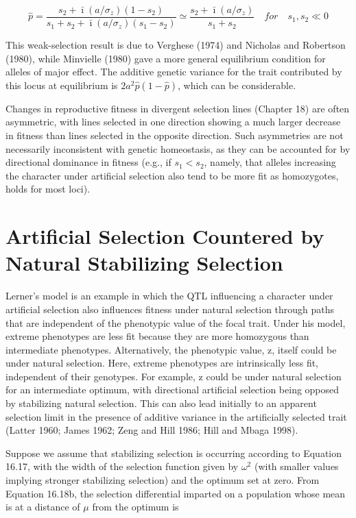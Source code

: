 \documentclass{article}
\begin{document}
\begin{equation}
\widehat{p}=\frac{s_{2}+\bar{\imath}\left(a/\sigma_{z}\right)\left(1-s_{2}\right)}{s_{1}+s_{2}+\bar{\imath}\left(a/\sigma_{z}\right)\left(s_{1}-s_{2}\right)}\simeq\frac{s_{2}+\bar{\imath}\left(a/\sigma_{z}\right)}{s_{1}+s_{2}}\quad for\quad s_{1},s_{2}\ll0
\tag{25.16}
\label{eq:25_16}
\end{equation}

This weak-selection result is due to Verghese (1974) and Nicholas and Robertson (1980), while Minvielle (1980) gave a more general equilibrium condition for alleles of major effect. The additive genetic variance for the trait contributed by this locus at equilibrium is  $ 2a^2 \widehat{p}(1 - \widehat{p}) $, which can be considerable.

Changes in reproductive fitness in divergent selection lines (Chapter 18) are often asymmetric, with lines selected in one direction showing a much larger decrease in fitness than lines selected in the opposite direction. Such asymmetries are not necessarily inconsistent with genetic homeostasis, as they can be accounted for by directional dominance in fitness (e.g., if  $ s_1 < s_2 $, namely, that alleles increasing the character under artificial selection also tend to be more fit as homozygotes, holds for most loci).

\section{Artificial Selection Countered by Natural Stabilizing Selection}
Lerner's model is an example in which the QTL influencing a character under artificial selection also influences fitness under natural selection through paths that are independent of the phenotypic value of the focal trait. Under his model, extreme phenotypes are less fit because they are more homozygous than intermediate phenotypes. Alternatively, the phenotypic value, z, itself could be under natural selection. Here, extreme phenotypes are intrinsically less fit, independent of their genotypes. For example, z could be under natural selection for an intermediate optimum, with directional artificial selection being opposed by stabilizing natural selection. This can also lead initially to an apparent selection limit in the presence of additive variance in the artificially selected trait (Latter 1960; James 1962; Zeng and Hill 1986; Hill and Mbaga 1998).

Suppose we assume that stabilizing selection is occurring according to Equation 16.17, with the width of the selection function given by  $ \omega^2 $ (with smaller values implying stronger stabilizing selection) and the optimum set at zero. From Equation 16.18b, the selection differential imparted on a population whose mean is at a distance of  $ \mu $ from the optimum is
\end{document}
